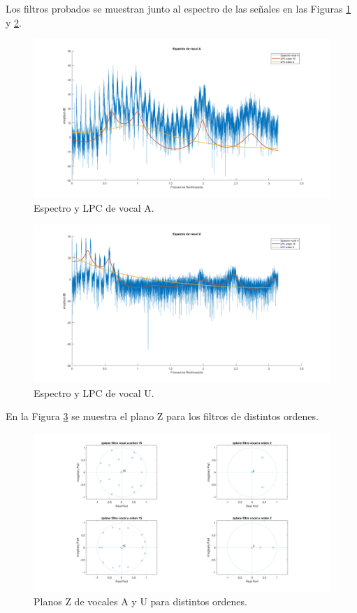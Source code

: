 \documentclass[letterpaper,onecolumn,10pt,journal,final]{IEEEtran}
\begin{document}
\begin{enumerate}[1)]
Los filtros probados se muestran junto al espectro de las señales en las Figuras \ref{P4_2A} y \ref{P4_2U}.
%
\begin{figure}[H]
    \centering
    \includegraphics[width = 0.9 \linewidth]{Figuras/P4_2A.png}
    \caption{Espectro y LPC de vocal A.}
    \label{P4_2A}
\end{figure}
%
\begin{figure}[H]
    \centering
    \includegraphics[width = 0.9 \linewidth]{Figuras/P4_2U.png}
    \caption{Espectro y LPC de vocal U.}
    \label{P4_2U}
\end{figure}
%

En la Figura \ref{P4_2Z} se muestra el plano Z para los filtros de distintos ordenes.
%
\begin{figure}[H]
    \centering
    \includegraphics[width = 0.9 \linewidth]{Figuras/P4_2Z.png}
    \caption{Planos Z de vocales A y U para distintos ordenes.}
    \label{P4_2Z}
\end{figure}


\end{enumerate}
\end{document}
